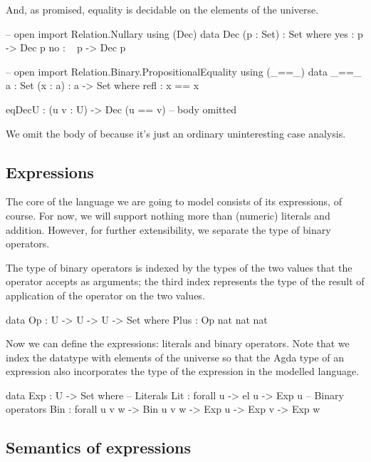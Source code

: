 \noindent And, as promised, equality is decidable on the elements of the
universe.

\begin{code}
  -- open import Relation.Nullary using (Dec)
  data Dec (p : Set) : Set where
    yes : p -> Dec p
    no  : ~ p -> Dec p

  -- open import Relation.Binary.PropositionalEquality using (_==_)
  data _==_ {a : Set} (x : a) : a -> Set where
    refl : x == x

  eqDecU : (u v : U) -> Dec (u == v)
  -- body omitted
\end{code}

\noindent We omit the body of  because it's just an ordinary
uninteresting case analysis.

\subsection{Expressions}

The core of the language we are going to model consists of its expressions, of
course. For now, we will support nothing more than (numeric) literals and addition.
However, for further extensibility, we separate the type of binary operators.

The type of binary operators is indexed by the types of the two values that
the operator accepts as arguments; the third index represents the type of
the result of application of the operator on the two values.

\begin{code}
  data Op : U -> U -> U -> Set where
    Plus : Op nat nat nat
\end{code}

\noindent Now we can define the expressions: literals and binary operators.
Note that we index the datatype with elements of the universe  so that
the Agda type of an expression also incorporates the type of the expression in
the modelled language.

\begin{code}
  data Exp : U -> Set where
    -- Literals
    Lit : forall {u} -> el u -> Exp u
    -- Binary operators
    Bin : forall {u v w} -> Bin u v w -> Exp u -> Exp v -> Exp w
\end{code}

\subsection{Semantics of expressions}

